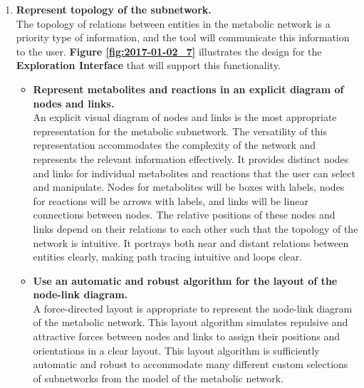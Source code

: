 \begin{enumerate}
\begin{itemize}
\end{itemize}

\item \textbf{Represent topology of the subnetwork.}
\\ The topology of relations between entities in the metabolic network is a priority type of information, and the tool will communicate this information to the user.
\textbf{Figure \ref{fig:2017-01-02_7}} illustrates the design for the \textbf{Exploration Interface} that will support this functionality.

\begin{itemize}

\item \textbf{Represent metabolites and reactions in an explicit diagram of nodes and links.}
\\ An explicit visual diagram of nodes and links is the most appropriate representation for the metabolic subnetwork.
The versatility of this representation accommodates the complexity of the network and represents the relevant information effectively.
It provides distinct nodes and links for individual metabolites and reactions that the user can select and manipulate.
Nodes for metabolites will be boxes with labels, nodes for reactions will be arrows with labels, and links will be linear connections between nodes.
The relative positions of these nodes and links depend on their relations to each other such that the topology of the network is intuitive.
It portrays both near and distant relations between entities clearly, making path tracing intuitive and loops clear.

\item \textbf{Use an automatic and robust algorithm for the layout of the node-link diagram.}
\\ A force-directed layout is appropriate to represent the node-link diagram of the metabolic network.
This layout algorithm simulates repulsive and attractive forces between nodes and links to assign their positions and orientations in a clear layout.
This layout algorithm is sufficiently automatic and robust to accommodate many different custom selections of subnetworks from the model of the metabolic network.


\end{itemize}
\end{enumerate}

